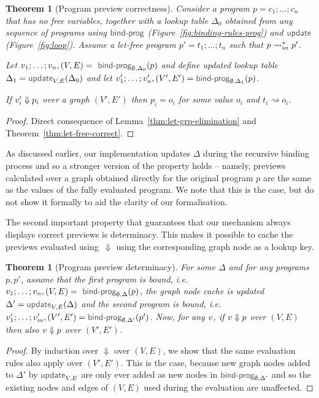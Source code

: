 \documentclass[acmsmall,anonymous,fleqn]{acmart}\settopmatter{printfolios=false,printccs=false,printacmref=false}
\newcounter{thc}
\theoremstyle{plain}
\newtheorem{theorem}[thc]{Theorem}
\theoremstyle{definition}
\newcommand{\ident}[1]{\textnormal{\textcolor{idclr}{\sffamily #1}}}
\newcommand{\bndclr}[1]{\textcolor{kvdclr}{#1}}
\begin{document}
\begin{theorem}[Program preview correctness]
\label{thm:correcntess}
Consider a program $p=c_1;\ldots;c_n$ that has no free variables, together with a lookup table
$\Delta_0$ obtained from any sequence of programs using $\ident{bind-prog}$
(Figure~\ref{fig:binding-rules-prog}) and $\ident{update}$ (Figure~\ref{fig:loop}). Assume a
let-free program $p'=t_1;\ldots;t_n$ such that $p\rightsquigarrow^{*}_\ident{let}p'$.

\vspace{0.25em}
\noindent
Let $\bndclr{v_1};\ldots;\bndclr{v_n}, (V, E) = \ident{bind-prog}_{\emptyset, \Delta_0}(p)$
and define updated lookup table $\Delta_1=\ident{update}_{V, E}(\Delta_0)$ and
let $\bndclr{v'_1};\ldots;\bndclr{v'_n}, (V', E') = \ident{bind-prog}_{\emptyset, \Delta_1}(p)$.

\vspace{0.25em}
\noindent
If $\bndclr{v'_i}\Downarrow p_i$ over a graph $(V', E')$ then $p_i=o_i$ for some value $o_i$ and
$t_i \rightsquigarrow o_i$.
\end{theorem}
\begin{proof}
Direct consequence of Lemma~\ref{thm:let-grp-elimination} and Theorem~\ref{thm:let-free-correct}.
\end{proof}

As discussed earlier, our implementation updates $\Delta$ during the recursive binding process and
so a stronger version of the property holds -- namely, previews calculated over a graph obtained
directly for the original program $p$ are the same as the values of the fully evaluated program.
We note that this is the case, but do not show it formally to aid the clarity of our formalisation.

The second important property that guarantees that our mechanism always displays correct previews
is determinacy. This makes it possible to cache the previews evaluated using~$\Downarrow$ using
the corresponding graph node as a lookup key.

\begin{theorem}[Program preview determinacy]
\label{thm:determinacy}
For some $\Delta$ and for any programs $p, p'$, assume that the first program is bound,
i.e.~$\bndclr{v_1};\ldots;\bndclr{v_n}, (V, E) = \ident{bind-prog}_{\emptyset, \Delta}(p)$,
the graph node cache is updated $\Delta' = \ident{update}_{V, E}(\Delta)$ and the second program is
bound, i.e.~$\bndclr{v'_1};\ldots;\bndclr{v'_m}, (V', E') = \ident{bind-prog}_{\emptyset, \Delta'}(p')$.
Now, for any $\bndclr{v}$, if $\bndclr{v} \Downarrow p$ over $(V, E)$ then also
 $\bndclr{v} \Downarrow p$ over $(V', E')$.
\end{theorem}
\begin{proof}
By induction over $\Downarrow$ over $(V, E)$, we show that the same evaluation rules also
apply over $(V', E')$.
This is the case, because new graph nodes added to $\Delta'$ by $\ident{update}_{V, E}$
are only ever added as new nodes in $\ident{bind-prog}_{\emptyset, \Delta'}$ and so the existing
nodes and edges of $(V, E)$ used during the evaluation are unaffected.
\end{proof}
\end{document}
